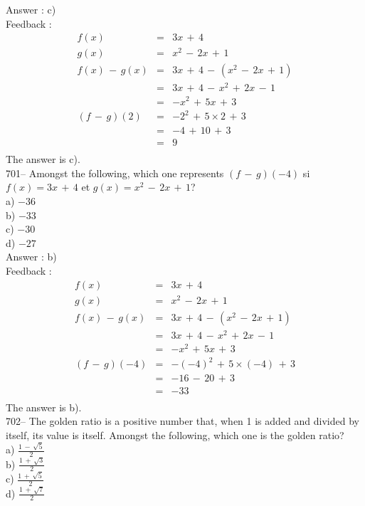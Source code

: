 \documentclass[letterpaper, 12pt]{article}
\begin{document}
Answer : c)\\

Feedback : \\
\begin{eqnarray*}
f(x)&=&3x\,+\,4\\
g(x)&=&x^{2}\,-\,2x\,+\,1\\
f(x)\,-\,g(x)&=&3x\,+\,4\,-\,(x^{2}\,-\,2x\,+\,1)\\
&=&3x\,+\,4\,-\,x^{2}\,+\,2x\,-\,1\\
&=&-x^{2}\,+\,5x\,+\,3\\
(f\,-\,g)(2)&=& - 2^{2}\,+\,5\times2\,+\,3\\
&=&-4\,+\,10\,+\,3\\
&=&9\\
\end{eqnarray*}
The answer is c).\\

701-- Amongst the following, which one represents $(f\,-\,g)(-4)$
si $f(x)=3x\,+\,4$ et $g(x)=x^{2}\,-\,2x\,+\,1$?\\
a) $-36$\\
b) $-33$\\
c) $-30$\\
d) $-27$\\

Answer : b)\\

Feedback : \\
\begin{eqnarray*}
f(x)&=&3x\,+\,4\\
g(x)&=&x^{2}\,-\,2x\,+\,1\\
f(x)\,-\,g(x)&=&3x\,+\,4\,-\,(x^{2}\,-\,2x\,+\,1)\\
&=&3x\,+\,4\,-\,x^{2}\,+\,2x\,-\,1\\
&=&-x^{2}\,+\,5x\,+\,3\\
(f\,-\,g)(-4)&=& - (-4)^{2}\,+\,5\times(-4)\,+\,3\\
&=&-16\,-\,20\,+\,3\\
&=&-33\\
\end{eqnarray*}
The answer is b).\\

702-- The golden ratio is a positive number that, when 1 is added and divided by itself, its value is itself. Amongst the following,
which one is the golden ratio?\\
a) $\frac{1\,-\,\sqrt{5}}{2}$\\
b) $\frac{1\,+\,\sqrt{3}}{2}$\\
c) $\frac{1\,+\,\sqrt{5}}{2}$\\
d) $\frac{1\,+\,\sqrt{7}}{2}$\\
\end{document}
